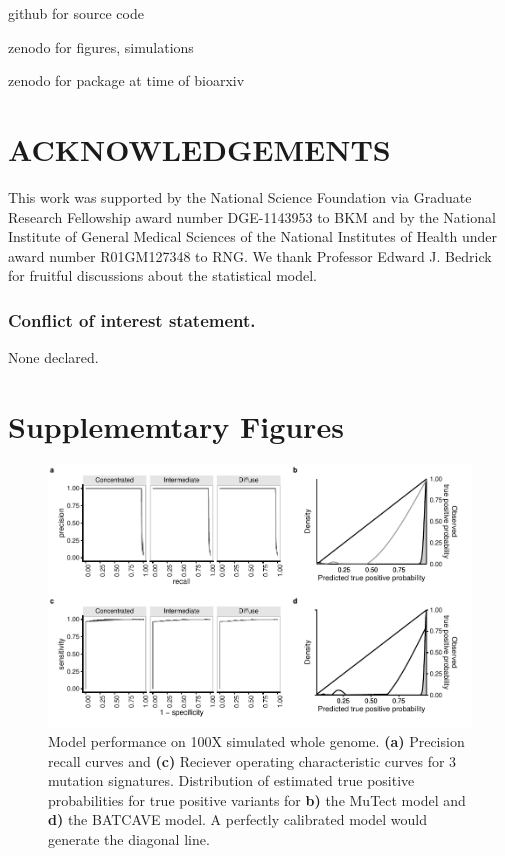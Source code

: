 \documentclass[a4,center,fleqn]{NAR}
\newcommand{\batcave}{BATCAVE }
\newcommand{\beginsupplement}{%
        \clearpage
        \onecolumn
        \setcounter{table}{0}
        \renewcommand{\thetable}{S\arabic{table}}%
        \setcounter{figure}{0}
        \renewcommand{\thefigure}{S\arabic{figure}}%
     }
\begin{document}
github for source code

zenodo for figures, simulations

zenodo for package at time of bioarxiv

\section{ACKNOWLEDGEMENTS}

This work was supported by the National Science Foundation via Graduate Research Fellowship award number DGE-1143953 to BKM and by the National Institute of General Medical Sciences of the National Institutes of Health under award number R01GM127348 to RNG.
We thank Professor Edward J. Bedrick for fruitful discussions about the statistical model.

\subsubsection{Conflict of interest statement.} None declared.



\beginsupplement
\section{Supplememtary Figures}

\begin{figure}[b]
  \begin{center}
  \includegraphics{figures/fig_wgs.pdf}
  \end{center}
  \caption{Model performance on 100X simulated whole genome.
  \textbf{(a)} Precision recall curves and \textbf{(c)} Reciever operating characteristic curves for 3 mutation signatures.
  Distribution of estimated true positive probabilities for true positive  variants for \textbf{b)} the MuTect model and \textbf{d)} the \batcave model.
  A perfectly calibrated model would generate the diagonal line.}
\label{NAR-wgs_fig}
\end{figure}
\end{document}
